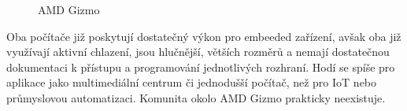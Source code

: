 \begin{figure}[!ht]
    \centering
			\hspace*{5mm}
		\caption{AMD Gizmo}
\end{figure}



	
Oba počítače již poskytují dostatečný výkon pro embeeded zařízení, avšak oba již využívají aktivní chlazení, jsou hlučnější, větších rozměrů a nemají dostatečnou dokumentaci k přístupu a programování jednotlivých rozhraní. Hodí se spíše pro aplikace jako multimediální centrum či jednodušší počítač, než pro IoT nebo průmyslovou automatizaci. Komunita okolo AMD Gizmo prakticky neexistuje.
	
	



